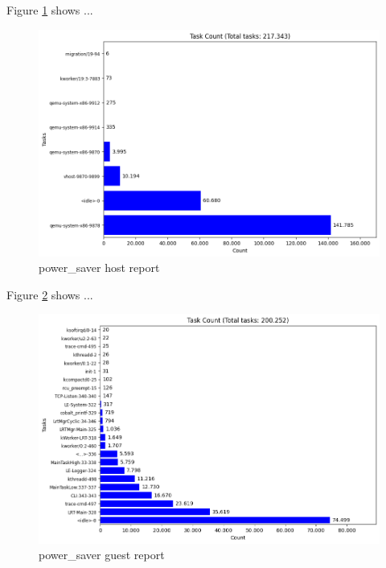 \documentclass[MMR,Master,english]{twbook}
\begin{document}
Figure \ref{fig:power_saver_kvm_host} shows ...

\begin{figure}[H]
	\centering
	\includegraphics[width=1.0\columnwidth]{img/power_saver/results_host_report.png}
	\caption[power\_saver host report]{power\_saver host report}
	\label{fig:power_saver_kvm_host}
\end{figure}
\clearpage

Figure \ref{fig:power_saver_kvm_guest} shows ...

\begin{figure}[H]
	\centering
	\includegraphics[width=1.0\columnwidth]{img/power_saver/results_guest_report.png}
	\caption[power\_saver guest report]{power\_saver guest report}
	\label{fig:power_saver_kvm_guest}
\end{figure}
\clearpage
\end{document}
